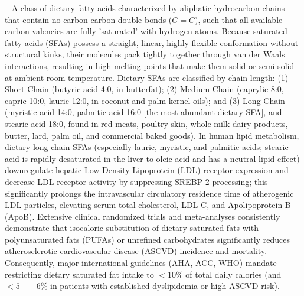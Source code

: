 -- A class of dietary fatty acids characterized by aliphatic hydrocarbon chains that contain no carbon-carbon double bonds ($C=C$), such that all available carbon valencies are fully 'saturated' with hydrogen atoms. Because saturated fatty acids (SFAs) possess a straight, linear, highly flexible conformation without structural kinks, their molecules pack tightly together through van der Waals interactions, resulting in high melting points that make them solid or semi-solid at ambient room temperature. Dietary SFAs are classified by chain length: (1) Short-Chain (butyric acid 4:0, in butterfat); (2) Medium-Chain (caprylic 8:0, capric 10:0, lauric 12:0, in coconut and palm kernel oils); and (3) Long-Chain (myristic acid 14:0, palmitic acid 16:0 [the most abundant dietary SFA], and stearic acid 18:0, found in red meats, poultry skin, whole-milk dairy products, butter, lard, palm oil, and commercial baked goods). In human lipid metabolism, dietary long-chain SFAs (especially lauric, myristic, and palmitic acids; stearic acid is rapidly desaturated in the liver to oleic acid and has a neutral lipid effect) downregulate hepatic Low-Density Lipoprotein (LDL) receptor expression and decrease LDL receptor activity by suppressing SREBP-2 processing; this significantly prolongs the intravascular circulatory residence time of atherogenic LDL particles, elevating serum total cholesterol, LDL-C, and Apolipoprotein B (ApoB). Extensive clinical randomized trials and meta-analyses consistently demonstrate that isocaloric substitution of dietary saturated fats with polyunsaturated fats (PUFAs) or unrefined carbohydrates significantly reduces atherosclerotic cardiovascular disease (ASCVD) incidence and mortality. Consequently, major international guidelines (AHA, ACC, WHO) mandate restricting dietary saturated fat intake to $<10\%$ of total daily calories (and $<5--6\%$ in patients with established dyslipidemia or high ASCVD risk).

